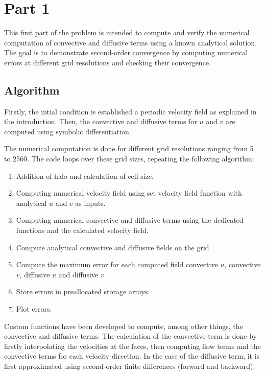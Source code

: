 \section{Part 1}

This first part of the problem is intended to compute and verify the numerical computation of convective and diffusive terms using a known analytical solution. The goal is to demonstrate second-order convergence by computing numerical errors at different grid resolutions and checking their convergence.

\subsection{Algorithm}

Firstly, the intial condition is established a periodic velocity field as explained in the introduction. Then, the convective and diffusive terms for $u$ and $v$ are computed using symbolic differentiation.

The numerical computation is done for different grid resolutions ranging from 5 to 2560. The code loops over these grid sizes, repeating the following algorithm:

\begin{enumerate}
    \item Addition of halo and calculation of cell size.
    \item Computing numerical velocity field using set velocity field function with analytical $u$ and $v$ as inputs.
    \item Computing numerical convective and diffusive terms using the dedicated functions and the calculated velocity field.
    \item Compute analytical convective and diffusive fields on the grid
    \item Compute the maximum error for each computed field convective $u$, convective $v$, diffusive $u$ and diffusive $v$.
    \item Store errors in preallocated storage arrays.
    \item Plot errors.
\end{enumerate}

Custom functions have been developed to compute, among other things, the convective and diffusive terms. The calculation of the convective term is done by firstly interpolating the velocities at the faces, then computing flow terms and the convective terms for each velocity direction. In the case of the diffusive term, it is first approximated using second-order finite differences (forward and backward).

